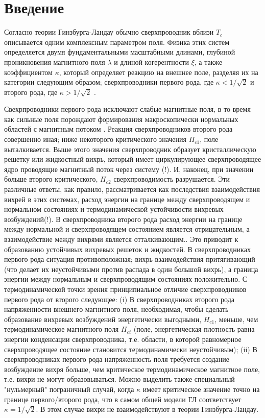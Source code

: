 \chapter{Введение}
\label{ch:1}

Согласно теории Гинзбурга-Ландау обычно сверхпроводник вблизи \( T_c \) 
описывается одним комплексным параметром поля. Физика этих систем определяется 
двумя фундаментальными масштабными длинами, глубиной проникновения магнитного 
поля \( \lambda \) и длиной когерентности \( \xi \), а также коэффициентом 
\( \kappa \), который определяет реакцию на внешнее поле, разделяя их на 
категории следующим образом; сверхпроводники первого рода, где 
\( \kappa < 1/\sqrt{2} \) и второго рода, где \( \kappa > 1/\sqrt{2} \) 
\cite{bib:3}.

Свехрпроводники первого рода исключают слабые магнитные поля, в то время как 
сильные поля порождают формирования макроскопически нормальных областей с 
магнитным потоком \cite{bib:4}. Реакция сверхпроводников второго рода 
совершенно иная; ниже некоторого критического значения \( H_{c1} \), поле 
выталкивается. Выше этого значения сверхпроводник образует кристаллическую 
решетку или жидкостный вихрь, который имеет циркулирующее сверхпроводящее 
ядро проводящие магнитный поток через систему (!). И, наконец, при значении 
больше второго критического, \( H_{c2} \) сверхпроводимость разрушается. Эти 
различные ответы, как правило, рассматривается как последствия взаимодействия 
вихрей в этих системах, расход энергии на границе между сверхпроводящем и 
нормальном состояниях и термодинамической устойчивости вихревых возбуждений(!). 
В сверхпроводника второго рода расход энергии на границе между нормальной и 
сверхпроводящем состоянием является отрицательным, а взаимодействие между 
вихрями является отталкивающим.\cite{bib:3}. Это приводит к образованию 
устойчивых вихревых решеток и жидкостей. В сверхпроводниках первого рода 
ситуация противоположная; вихрь взаимодействия притягивающий (что делает их 
неустойчивыми против распада в один большой вихрь), а граница энергии между 
нормальным и сверхпроводящим состояниях положительно. С термодинамической 
точки зрения принципиальное отличие сверхпроводников первого рода от второго 
следующее: (i) В сверхпроводниках второго рода напряженности внешнего 
магнитного поля, необходимая, чтобы сделать образование вихревых возбуждений 
энергетически выгодными, \( H_{c1} \), меньше, чем термодинамическое 
магнитного поля \( H_{ct} \) (поле, энергетическая плотность равна энергии 
конденсации сверхпроводника, т.е. области, в которой равномерное 
сверхпроводящее состояние становится термодинамически неустойчивым); (ii) В 
сверхпроводниках первого рода напряженность поля требуется создание 
возбуждение вихря больше, чем критическое термодинамическое магнитное поле, 
т.е. вихри не могут образовываться. Можно выделить также специальный 
"нульмерный" пограничный случай, когда \( \kappa \) имеет критическое значение 
точно на границе первого/второго рода, что в самом общей модели ГЛ 
соответствует \( \kappa = 1/\sqrt{2} \). В этом случае вихри не 
взаимодействуют\cite{bib:5} в теории Гинзбурга-Ландау.

